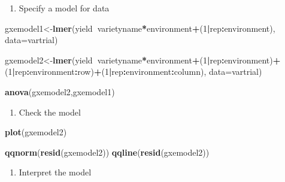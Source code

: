 \documentclass[]{book}
\newenvironment{Shaded}{\begin{snugshade}}{\end{snugshade}}
\newcommand{\KeywordTok}[1]{\textcolor[rgb]{0.13,0.29,0.53}{\textbf{#1}}}
\newcommand{\DataTypeTok}[1]{\textcolor[rgb]{0.13,0.29,0.53}{#1}}
\newcommand{\DecValTok}[1]{\textcolor[rgb]{0.00,0.00,0.81}{#1}}
\newcommand{\OperatorTok}[1]{\textcolor[rgb]{0.81,0.36,0.00}{\textbf{#1}}}
\newcommand{\NormalTok}[1]{#1}
\providecommand{\tightlist}{%
  \setlength{\itemsep}{0pt}\setlength{\parskip}{0pt}}
\theoremstyle{definition}
\theoremstyle{definition}
\theoremstyle{definition}
\theoremstyle{remark}
\begin{document}
\begin{enumerate}
\def\labelenumi{\arabic{enumi}.}
\setcounter{enumi}{4}
\tightlist
\item
  Specify a model for data
\end{enumerate}

\begin{Shaded}
\begin{Highlighting}[]
\NormalTok{gxemodel1<-}\KeywordTok{lmer}\NormalTok{(yield}\OperatorTok{~}\NormalTok{varietyname}\OperatorTok{*}\NormalTok{environment}\OperatorTok{+}\NormalTok{(}\DecValTok{1}\OperatorTok{|}\NormalTok{rep}\OperatorTok{:}\NormalTok{environment), }\DataTypeTok{data=}\NormalTok{vartrial)}

\NormalTok{gxemodel2<-}\KeywordTok{lmer}\NormalTok{(yield}\OperatorTok{~}\NormalTok{varietyname}\OperatorTok{*}\NormalTok{environment}\OperatorTok{+}\NormalTok{(}\DecValTok{1}\OperatorTok{|}\NormalTok{rep}\OperatorTok{:}\NormalTok{environment)}\OperatorTok{+}\NormalTok{(}\DecValTok{1}\OperatorTok{|}\NormalTok{rep}\OperatorTok{:}\NormalTok{environment}\OperatorTok{:}\NormalTok{row)}\OperatorTok{+}\NormalTok{(}\DecValTok{1}\OperatorTok{|}\NormalTok{rep}\OperatorTok{:}\NormalTok{environment}\OperatorTok{:}\NormalTok{column), }\DataTypeTok{data=}\NormalTok{vartrial)}

\KeywordTok{anova}\NormalTok{(gxemodel2,gxemodel1)}
\end{Highlighting}
\end{Shaded}

\begin{enumerate}
\def\labelenumi{\arabic{enumi}.}
\setcounter{enumi}{5}
\tightlist
\item
  Check the model
\end{enumerate}

\begin{Shaded}
\begin{Highlighting}[]
\KeywordTok{plot}\NormalTok{(gxemodel2)}

\KeywordTok{qqnorm}\NormalTok{(}\KeywordTok{resid}\NormalTok{(gxemodel2))}
\KeywordTok{qqline}\NormalTok{(}\KeywordTok{resid}\NormalTok{(gxemodel2))}
\end{Highlighting}
\end{Shaded}

\begin{enumerate}
\def\labelenumi{\arabic{enumi}.}
\setcounter{enumi}{6}
\tightlist
\item
  Interpret the model
\end{enumerate}
\end{document}
